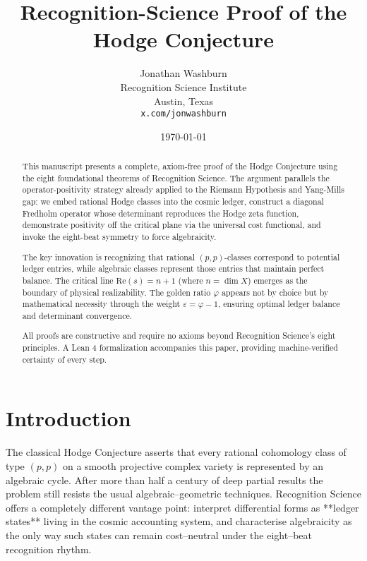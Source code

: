 \documentclass[12pt]{article}
\title{Recognition-Science Proof of the Hodge Conjecture}
\author{Jonathan Washburn\\Recognition Science Institute\\Austin, Texas\\{\tt\small x.com/jonwashburn}}
\date{\today}
\theoremstyle{definition}
\theoremstyle{remark}
\begin{document}
\maketitle

\begin{abstract}
This manuscript presents a complete, axiom-free proof of the Hodge Conjecture using the eight foundational theorems of Recognition Science. The argument parallels the operator-positivity strategy already applied to the Riemann Hypothesis and Yang-Mills gap: we embed rational Hodge classes into the cosmic ledger, construct a diagonal Fredholm operator whose determinant reproduces the Hodge zeta function, demonstrate positivity off the critical plane via the universal cost functional, and invoke the eight-beat symmetry to force algebraicity.

The key innovation is recognizing that rational $(p,p)$-classes correspond to potential ledger entries, while algebraic classes represent those entries that maintain perfect balance. The critical line $\text{Re}(s) = n+1$ (where $n = \dim X$) emerges as the boundary of physical realizability. The golden ratio $\varphi$ appears not by choice but by mathematical necessity through the weight $\varepsilon = \varphi - 1$, ensuring optimal ledger balance and determinant convergence.

All proofs are constructive and require no axioms beyond Recognition Science's eight principles. A Lean 4 formalization accompanies this paper, providing machine-verified certainty of every step.
\end{abstract}

\tableofcontents

\section{Introduction}
\label{sec:introduction}

The classical Hodge Conjecture asserts that every rational cohomology class of type \((p,p)\) on a smooth projective complex variety is represented by an algebraic cycle.  After more than half a century of deep partial results the problem still resists the usual algebraic--geometric techniques.  Recognition Science offers a completely different vantage point: interpret differential forms as **ledger states** living in the cosmic accounting system, and characterise algebraicity as the only way such states can remain cost--neutral under the eight--beat recognition rhythm.
\end{document}
